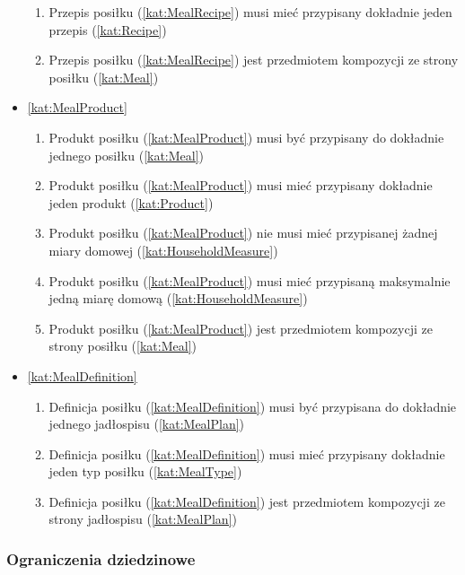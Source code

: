 \begin{itemize}[label={\textbf{Reguły dla}}, wide, labelwidth=!, labelindent=0pt]
\begin{enumerate}[label={\textbf{REG/3/\protect\twodigits{\arabic{enumi}}}}, wide, labelwidth=!, align=left, leftmargin=3cm, resume]
        \item Przepis posiłku (\ref{kat:MealRecipe}) musi mieć przypisany dokładnie jeden przepis (\ref{kat:Recipe})
        \item Przepis posiłku (\ref{kat:MealRecipe}) jest przedmiotem kompozycji ze strony posiłku (\ref{kat:Meal})
    \end{enumerate}
    \item\ref{kat:MealProduct}\mynobreakpar
    \begin{enumerate}[label={\textbf{REG/3/\protect\twodigits{\arabic{enumi}}}}, wide, labelwidth=!, align=left, leftmargin=3cm, resume]
        \item Produkt posiłku (\ref{kat:MealProduct}) musi być przypisany do dokładnie jednego posiłku (\ref{kat:Meal})
        \item Produkt posiłku (\ref{kat:MealProduct}) musi mieć przypisany dokładnie jeden produkt (\ref{kat:Product})
        \item Produkt posiłku (\ref{kat:MealProduct}) nie musi mieć przypisanej żadnej miary domowej (\ref{kat:HouseholdMeasure})
        \item Produkt posiłku (\ref{kat:MealProduct}) musi mieć przypisaną maksymalnie jedną miarę domową (\ref{kat:HouseholdMeasure})
        \item Produkt posiłku (\ref{kat:MealProduct}) jest przedmiotem kompozycji ze strony posiłku (\ref{kat:Meal})
    \end{enumerate}
    \item\ref{kat:MealDefinition}\mynobreakpar
    \begin{enumerate}[label={\textbf{REG/3/\protect\twodigits{\arabic{enumi}}}}, wide, labelwidth=!, align=left, leftmargin=3cm, resume]
        \item Definicja posiłku (\ref{kat:MealDefinition}) musi być przypisana do dokładnie jednego jadłospisu (\ref{kat:MealPlan})
        \item Definicja posiłku (\ref{kat:MealDefinition}) musi mieć przypisany dokładnie jeden typ posiłku (\ref{kat:MealType})
        \item Definicja posiłku (\ref{kat:MealDefinition}) jest przedmiotem kompozycji ze strony jadłospisu (\ref{kat:MealPlan})
    \end{enumerate}
\end{itemize}

\subsubsection{Ograniczenia dziedzinowe}\label{subsubsec:database:mealplans:restrictions}

